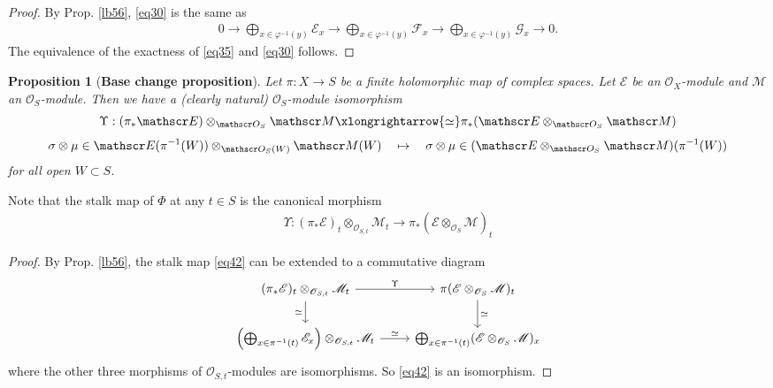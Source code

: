 \documentclass[12pt,b5paper,notitlepage]{report}
\theoremstyle{definition}
\theoremstyle{plain}
\newtheorem{pp}[df]{Proposition}
\newcommand{\scr}{\mathscr}
\numberwithin{equation}{section}
\begin{document}
\begin{proof}
By Prop. \ref{lb56}, \eqref{eq30} is the same as
\begin{align*}
0\rightarrow\bigoplus_{x\in\varphi^{-1}(y)}\scr E_x\rightarrow\bigoplus_{x\in\varphi^{-1}(y)}\scr F_x\rightarrow\bigoplus_{x\in\varphi^{-1}(y)}\scr G_x\rightarrow0.
\end{align*}
The equivalence of the exactness of \eqref{eq35} and \eqref{eq30} follows.
\end{proof}



\begin{pp}[\textbf{Base change proposition}]\label{lb59}
Let $\pi:X\rightarrow S$ be a finite holomorphic map of complex spaces. Let $\scr E$ be an $\scr O_X$-module and $\scr M$ an $\scr O_S$-module. Then we have a (clearly natural) $\scr O_S$-module isomorphism 
\begin{gather}
\begin{gathered}
\Upsilon:(\pi_*\scr E)\otimes_{\scr O_S}\scr M\xlongrightarrow{\simeq} \pi_*(\scr E\otimes_{\scr O_S}\scr M)\\[0.8ex]
\sigma\otimes\mu\in \scr E(\pi^{-1}(W))\otimes_{\scr O_S(W)}\scr M(W)\quad\mapsto \quad \sigma\otimes\mu \in(\scr E\otimes_{\scr O_S}\scr M)(\pi^{-1}(W))
\end{gathered}
\end{gather}
for all open $W\subset S$.
\end{pp}

Note that the stalk map of $\Phi$ at any $t\in S$ is the canonical morphism
\begin{gather}
\Upsilon:(\pi_*\scr E)_t\otimes_{\scr O_{S,t}}\scr M_t\longrightarrow \pi_*(\scr E\otimes_{\scr O_S}\scr M)_t \label{eq42}
\end{gather}

\begin{proof}
By Prop. \ref{lb56}, the stalk map \eqref{eq42} can be extended to a commutative diagram
\begin{equation}
\begin{tikzcd}
(\pi_*\scr E)_t\otimes_{\scr O_{S,t}}\scr M_t \arrow[r,"\Upsilon"] \arrow[d,"\simeq"'] & \pi(\scr E\otimes_{\scr O_S}\scr M)_t \arrow[d,"\simeq"] \\
\left(\bigoplus_{x\in\pi^{-1}(t)}\scr E_x\right)\otimes_{\scr O_{S,t}}\scr M_t \arrow[r,"\simeq"]           & \bigoplus_{x\in\pi^{-1}(t)}(\scr E\otimes_{\scr O_S}\scr M)_x          
\end{tikzcd}
\end{equation}
where the other three morphisms of $\scr O_{S,t}$-modules are isomorphisms. So \eqref{eq42} is an isomorphism.
\end{proof}
\end{document}
